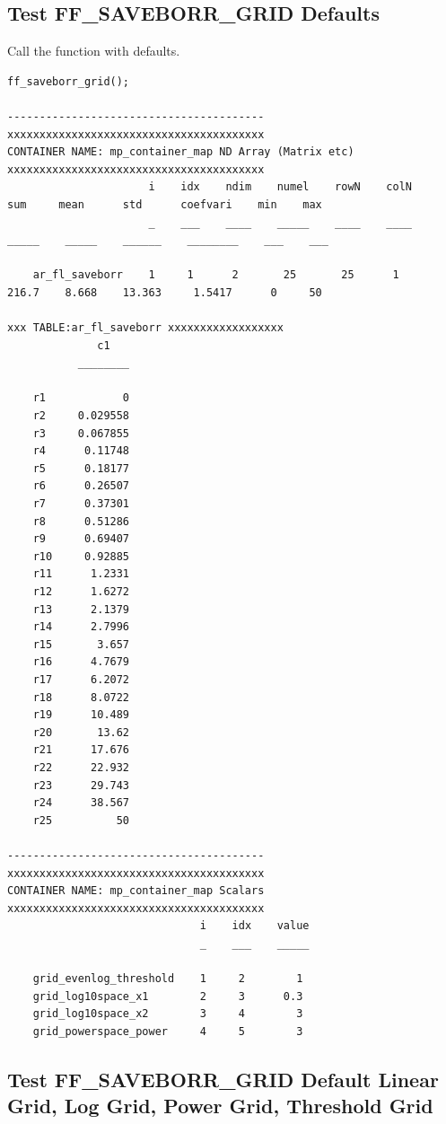 \documentclass[
]{book}
\begin{document}
\hypertarget{test-ff_saveborr_grid-defaults}{%
\subsection{Test FF\_SAVEBORR\_GRID Defaults}\label{test-ff_saveborr_grid-defaults}}

Call the function with defaults.

\begin{verbatim}
ff_saveborr_grid();

----------------------------------------
xxxxxxxxxxxxxxxxxxxxxxxxxxxxxxxxxxxxxxxx
CONTAINER NAME: mp_container_map ND Array (Matrix etc)
xxxxxxxxxxxxxxxxxxxxxxxxxxxxxxxxxxxxxxxx
                      i    idx    ndim    numel    rowN    colN     sum     mean      std      coefvari    min    max
                      _    ___    ____    _____    ____    ____    _____    _____    ______    ________    ___    ___

    ar_fl_saveborr    1     1      2       25       25      1      216.7    8.668    13.363     1.5417      0     50 

xxx TABLE:ar_fl_saveborr xxxxxxxxxxxxxxxxxx
              c1   
           ________

    r1            0
    r2     0.029558
    r3     0.067855
    r4      0.11748
    r5      0.18177
    r6      0.26507
    r7      0.37301
    r8      0.51286
    r9      0.69407
    r10     0.92885
    r11      1.2331
    r12      1.6272
    r13      2.1379
    r14      2.7996
    r15       3.657
    r16      4.7679
    r17      6.2072
    r18      8.0722
    r19      10.489
    r20       13.62
    r21      17.676
    r22      22.932
    r23      29.743
    r24      38.567
    r25          50

----------------------------------------
xxxxxxxxxxxxxxxxxxxxxxxxxxxxxxxxxxxxxxxx
CONTAINER NAME: mp_container_map Scalars
xxxxxxxxxxxxxxxxxxxxxxxxxxxxxxxxxxxxxxxx
                              i    idx    value
                              _    ___    _____

    grid_evenlog_threshold    1     2        1 
    grid_log10space_x1        2     3      0.3 
    grid_log10space_x2        3     4        3 
    grid_powerspace_power     4     5        3 
\end{verbatim}

\hypertarget{test-ff_saveborr_grid-default-linear-grid-log-grid-power-grid-threshold-grid}{%
\subsection{Test FF\_SAVEBORR\_GRID Default Linear Grid, Log Grid, Power Grid, Threshold Grid}\label{test-ff_saveborr_grid-default-linear-grid-log-grid-power-grid-threshold-grid}}
\end{document}
